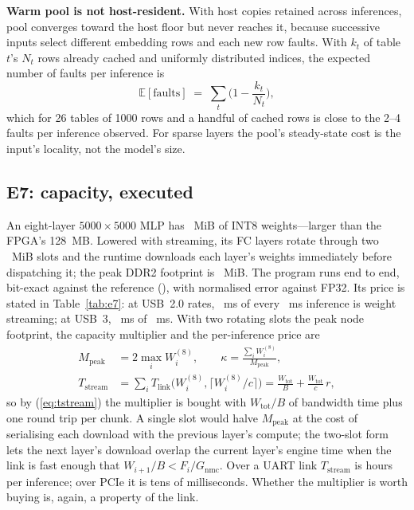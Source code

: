 \documentclass[lettersize,journal]{IEEEtran}
\begin{document}
\textbf{Warm pool is not host-resident.} With host copies retained across inferences, pool converges toward the host floor but never reaches it, because successive inputs select different embedding rows and each new row faults. With $k_t$ of table $t$'s $N_t$ rows already cached and uniformly distributed indices, the expected number of faults per inference is
\begin{equation}
\mathbb{E}[\text{faults}] \;=\; \sum_{t} \Big(1 - \frac{k_t}{N_t}\Big),
\label{eq:warm}
\end{equation}
which for 26 tables of 1000 rows and a handful of cached rows is close to the 2--4 faults per inference observed. For sparse layers the pool's steady-state cost is the input's locality, not the model's size.

\subsection{E7: capacity, executed}
\label{sec:capacity}
An eight-layer $5000{\times}5000$ MLP has \PMlpEightTotalWeightMiB~MiB of INT8 weights---larger than the FPGA's 128~MB. Lowered with streaming, its FC layers rotate through two \PMlpEightSlotMiB~MiB slots and the runtime downloads each layer's weights immediately before dispatching it; the peak DDR2 footprint is \PMlpEightLayoutMiB~MiB. The program runs end to end, bit-exact against the reference (\EsevennmcnolinkBitExact), with normalised error \EsevennmcnolinkNormErr{} against FP32. Its price is stated in Table~\ref{tab:e7}: at USB~2.0 rates, \EsevennmcusbtwoStream~ms of every \EsevennmcusbtwoMedian~ms inference is weight streaming; at USB~3, \EsevennmcusbthreeStream~ms of \EsevennmcusbthreeMedian~ms. With two rotating slots the peak node footprint, the capacity multiplier and the per-inference price are
\begin{align}
M_{\text{peak}} &= 2 \max_i W^{(8)}_i, \qquad \kappa = \frac{\sum_i W^{(8)}_i}{M_{\text{peak}}}, \label{eq:capacity}\\
T_{\text{stream}} &= \sum_i T_{\text{link}}\!\big(W^{(8)}_i, \lceil W^{(8)}_i/c \rceil\big) = \frac{W_{\text{tot}}}{B} + \frac{W_{\text{tot}}}{c}\,r , \label{eq:tstream}
\end{align}
so by (\ref{eq:tstream}) the multiplier is bought with $W_{\text{tot}}/B$ of bandwidth time plus one round trip per chunk. A single slot would halve $M_{\text{peak}}$ at the cost of serialising each download with the previous layer's compute; the two-slot form lets the next layer's download overlap the current layer's engine time when the link is fast enough that $W_{i+1}/B < F_i/G_{\text{nmc}}$. Over a UART link $T_{\text{stream}}$ is hours per inference; over PCIe it is tens of milliseconds. Whether the multiplier is worth buying is, again, a property of the link.
\end{document}
